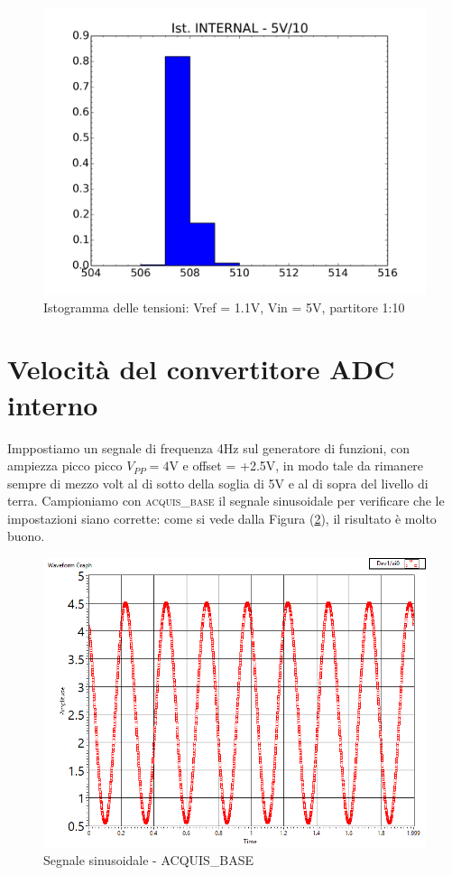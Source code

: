 \documentclass[journal, a4paper]{IEEEtran}
\begin{document}
\begin{figure}
\centering
\includegraphics[width=0.9\linewidth]{./ist_INTERNAL_part10_5V}
\caption{Istogramma delle tensioni: Vref = 1.1V, Vin = 5V, partitore 1:10}
\label{fig:ist_INTERNAL_part10_5V}
\end{figure}

\section{Velocità del convertitore ADC interno}

Imppostiamo un segnale di frequenza 4Hz sul generatore di funzioni, con ampiezza picco picco $V_{PP} = 4$V e offset = +2.5V, in modo tale da rimanere sempre di mezzo volt al di sotto della soglia di 5V e al di sopra del livello di terra. Campioniamo con \textsc{acquis\_base} il segnale sinusoidale per verificare che le impostazioni siano corrette: come si vede dalla Figura (\ref{fig:es11_provaacquisbase}), il risultato è molto buono.\\

\begin{figure}
\centering
\includegraphics[width=0.9\linewidth]{./es11_provaacquisbase}
\caption{Segnale sinusoidale - ACQUIS\_BASE}
\label{fig:es11_provaacquisbase}
\end{figure}
\end{document}
